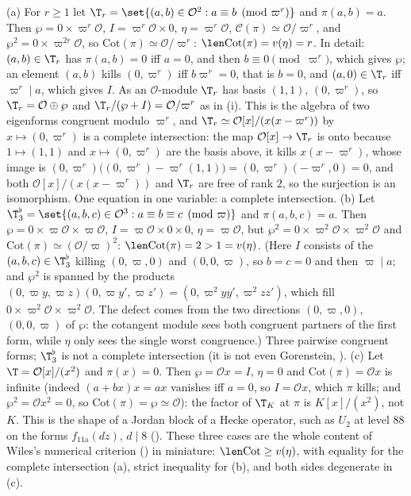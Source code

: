 \begin{example}\label{ex:congruence:toy}
(a) For $r\ge1$ let $\T_r=\set{(a,b)\in\mathcal O^2:a\equiv b\pmod{\varpi^r}}$ and $\pi(a,b)=a$. Then $\wp=0\times\varpi^r\mathcal O$, $I=\varpi^r\mathcal O\times0$, $\eta=\varpi^r\mathcal O$, $\mathcal C(\pi)\simeq\mathcal O/\varpi^r$,
and $\wp^2=0\times\varpi^{2r}\mathcal O$, so $\mathrm{Cot}(\pi)\simeq\mathcal O/\varpi^r$: $\len\mathrm{Cot}(\pi)=v(\eta)=r$. In detail: $(a,b)\in\T_r$ has $\pi(a,b)=0$ iff $a=0$, and then $b\equiv0\pmod{\varpi^r}$, which gives
$\wp$; an element $(a,b)$ kills $(0,\varpi^r)$ iff $b\varpi^r=0$, that is $b=0$, and $(a,0)\in\T_r$ iff $\varpi^r\mid a$, which gives $I$. As an $\mathcal O$-module $\T_r$ has basis $(1,1)$, $(0,\varpi^r)$, so
$\T_r=\mathcal O\oplus\wp$ and $\T_r/(\wp+I)=\mathcal O/\varpi^r$ as in (i). This is the algebra of two eigenforms congruent modulo $\varpi^r$, and
$\T_r\simeq\mathcal O[x]/(x(x-\varpi^r))$ by $x\mapsto(0,\varpi^r)$ is a complete intersection: the map $\mathcal O[x]\to\T_r$ is onto because $1\mapsto(1,1)$ and $x\mapsto(0,\varpi^r)$ are the basis above, it kills
$x(x-\varpi^r)$, whose image is $(0,\varpi^r)\bigl((0,\varpi^r)-\varpi^r(1,1)\bigr)=(0,\varpi^r)(-\varpi^r,0)=0$, and both $\mathcal O[x]/(x(x-\varpi^r))$ and $\T_r$ are free of rank $2$, so the surjection is an
isomorphism. One equation in one variable: a complete intersection.
(b) Let $\T_3^\flat=\set{(a,b,c)\in\mathcal O^3:a\equiv b\equiv c\pmod\varpi}$ and $\pi(a,b,c)=a$. Then $\wp=0\times\varpi\mathcal O\times\varpi\mathcal O$, $I=\varpi\mathcal O\times0\times0$, $\eta=\varpi\mathcal O$, but
$\wp^2=0\times\varpi^2\mathcal O\times\varpi^2\mathcal O$ and $\mathrm{Cot}(\pi)\simeq(\mathcal O/\varpi)^2$: $\len\mathrm{Cot}(\pi)=2>1=v(\eta)$. (Here $I$ consists of the $(a,b,c)\in\T_3^\flat$ killing
$(0,\varpi,0)$ and $(0,0,\varpi)$, so $b=c=0$ and then $\varpi\mid a$; and $\wp^2$ is spanned by the products $(0,\varpi y,\varpi z)(0,\varpi y',\varpi z')=(0,\varpi^2yy',\varpi^2zz')$, which fill
$0\times\varpi^2\mathcal O\times\varpi^2\mathcal O$. The defect comes from the two directions $(0,\varpi,0)$, $(0,0,\varpi)$ of $\wp$: the cotangent module sees both congruent partners of the
first form, while $\eta$ only sees the single worst congruence.) Three pairwise congruent forms; $\T_3^\flat$ is not a complete
intersection (it is not even Gorenstein, ).
(c) Let $\T=\mathcal O[x]/(x^2)$ and $\pi(x)=0$. Then $\wp=\mathcal Ox=I$, $\eta=0$ and $\mathrm{Cot}(\pi)=\mathcal Ox$ is infinite (indeed $(a+bx)x=ax$ vanishes iff $a=0$, so $I=\mathcal Ox$, which $\pi$ kills;
and $\wp^2=\mathcal Ox^2=0$, so $\mathrm{Cot}(\pi)=\wp\simeq\mathcal O$): the factor of $\T_K$ at $\pi$ is $K[x]/(x^2)$, not $K$. This is
the shape of a Jordan block of a Hecke operator, such as $U_2$ at level $88$ on the forms $f_{\text{11a}}(dz)$, $d\mid8$ ().
These three cases are the whole content of Wiles's numerical criterion () in miniature: $\len\mathrm{Cot}\ge v(\eta)$, with equality for
the complete intersection (a), strict inequality for (b), and both sides degenerate in (c).
\end{example}

